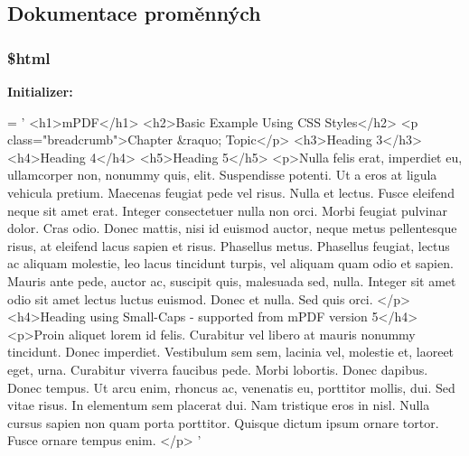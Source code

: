 \subsection{Dokumentace proměnných}
\hypertarget{example02___c_s_s__styles_8php_a6f96e7fc92441776c9d1cd3386663b40}{
\subsubsection[{\$html}]{\setlength{\rightskip}{0pt plus 5cm}\$html}}\label{example02___c_s_s__styles_8php_a6f96e7fc92441776c9d1cd3386663b40}
{\bfseries Initializer\-:}
\begin{DoxyCode}
= \textcolor{stringliteral}{'}
\textcolor{stringliteral}{<h1>mPDF</h1>}
\textcolor{stringliteral}{<h2>Basic Example Using CSS Styles</h2>}
\textcolor{stringliteral}{<p class="breadcrumb">Chapter &raquo; Topic</p>}
\textcolor{stringliteral}{<h3>Heading 3</h3>}
\textcolor{stringliteral}{<h4>Heading 4</h4>}
\textcolor{stringliteral}{<h5>Heading 5</h5>}
\textcolor{stringliteral}{<p>Nulla felis erat, imperdiet eu, ullamcorper non, nonummy quis, elit. Suspendisse potenti. Ut a eros at
       ligula vehicula pretium. Maecenas feugiat pede vel risus. Nulla et lectus. Fusce eleifend neque sit amet
       erat. Integer consectetuer nulla non orci. Morbi feugiat pulvinar dolor. Cras odio. Donec mattis, nisi id
       euismod auctor, neque metus pellentesque risus, at eleifend lacus sapien et risus. Phasellus metus. Phasellus
       feugiat, lectus ac aliquam molestie, leo lacus tincidunt turpis, vel aliquam quam odio et sapien. Mauris ante
       pede, auctor ac, suscipit quis, malesuada sed, nulla. Integer sit amet odio sit amet lectus luctus euismod.
       Donec et nulla. Sed quis orci. </p>}
\textcolor{stringliteral}{<h4>Heading using Small-Caps - supported from mPDF version 5</h4>}
\textcolor{stringliteral}{<p>Proin aliquet lorem id felis. Curabitur vel libero at mauris nonummy tincidunt. Donec imperdiet.
       Vestibulum sem sem, lacinia vel, molestie et, laoreet eget, urna. Curabitur viverra faucibus pede. Morbi lobortis.
       Donec dapibus. Donec tempus. Ut arcu enim, rhoncus ac, venenatis eu, porttitor mollis, dui. Sed vitae risus.
       In elementum sem placerat dui. Nam tristique eros in nisl. Nulla cursus sapien non quam porta porttitor.
       Quisque dictum ipsum ornare tortor. Fusce ornare tempus enim. </p>}
\textcolor{stringliteral}{'}
\end{DoxyCode}


